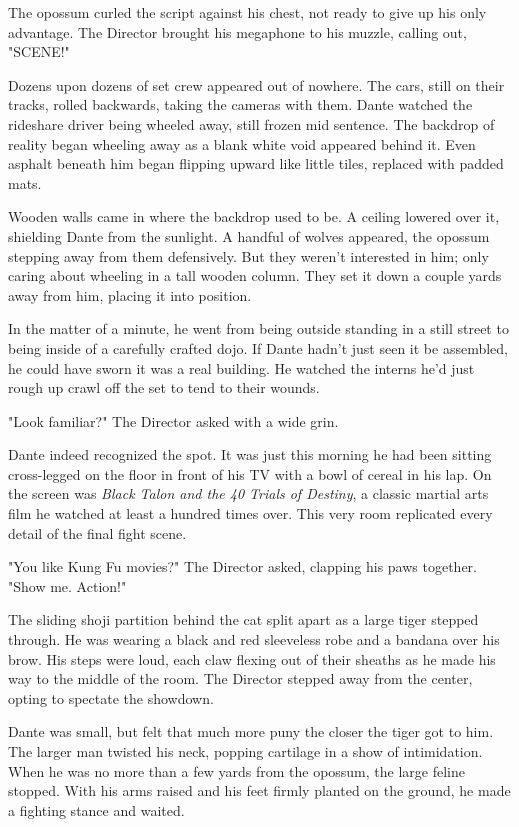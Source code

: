 The opossum curled the script against his chest, not ready to give up his only advantage. The Director brought his megaphone to his muzzle, calling out, "SCENE!"

Dozens upon dozens of set crew appeared out of nowhere. The cars, still on their tracks, rolled backwards, taking the cameras with them. Dante watched the rideshare driver being wheeled away, still frozen mid sentence. The backdrop of reality began wheeling away as a blank white void appeared behind it. Even asphalt beneath him began flipping upward like little tiles, replaced with padded mats.

Wooden walls came in where the backdrop used to be. A ceiling lowered over it, shielding Dante from the sunlight. A handful of wolves appeared, the opossum stepping away from them defensively. But they weren't interested in him; only caring about wheeling in a tall wooden column. They set it down a couple yards away from him, placing it into position.

In the matter of a minute, he went from being outside standing in a still street to being inside of a carefully crafted dojo. If Dante hadn't just seen it be assembled, he could have sworn it was a real building. He watched the interns he'd just rough up crawl off the set to tend to their wounds.

"Look familiar?" The Director asked with a wide grin.

Dante indeed recognized the spot. It was just this morning he had been sitting cross-legged on the floor in front of his TV with a bowl of cereal in his lap. On the screen was \emph{Black Talon and the 40 Trials of Destiny}, a classic martial arts film he watched at least a hundred times over. This very room replicated every detail of the final fight scene.

"You like Kung Fu movies?" The Director asked, clapping his paws together. "Show me. Action!"

The sliding shoji partition behind the cat split apart as a large tiger stepped through. He was wearing a black and red sleeveless robe and a bandana over his brow. His steps were loud, each claw flexing out of their sheaths as he made his way to the middle of the room. The Director stepped away from the center, opting to spectate the showdown.

Dante was small, but felt that much more puny the closer the tiger got to him. The larger man twisted his neck, popping cartilage in a show of intimidation. When he was no more than a few yards from the opossum, the large feline stopped. With his arms raised and his feet firmly planted on the ground, he made a fighting stance and waited.

